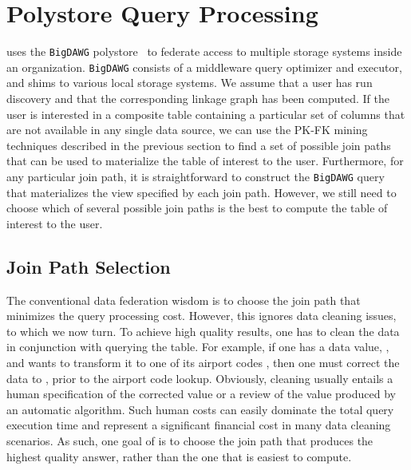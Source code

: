 \section{Polystore Query Processing}
\label{sec:curating}

\dcv uses the \texttt{BigDAWG}
polystore~\cite{DBLP:journals/pvldb/ElmoreDSBCGHHKK15} to federate access to
multiple storage systems inside an organization. \texttt{BigDAWG} consists of a
middleware query optimizer and executor, and shims to various local storage
systems. We assume that a user has run discovery and that the corresponding
linkage graph has been computed.  If the user is interested in a composite table
containing a particular set of columns that are not available in any single data
source,  we can use the PK-FK mining techniques described in the previous
section to find a set of possible join paths that can be used to materialize the
table of interest to the user. Furthermore, for any particular join path, it is
straightforward to construct the \texttt{BigDAWG} query that materializes the
view specified by each join path. However, we still need to choose which of
several possible join paths is the best to compute the table of interest to the
user.
	



\subsection{Join Path Selection}

The conventional data federation wisdom is to choose the join path that minimizes the query processing cost. However, this ignores data cleaning issues, to which we now turn. To achieve high quality results, one has to clean the data in conjunction with querying the table. For example, if one has a data value, , and wants to transform it to one of its airport codes , then one must correct the data to , prior to the airport code lookup. Obviously, cleaning usually entails a human specification of the corrected value or a review of the value produced by an automatic algorithm. Such human costs can easily dominate the total query execution time and represent a significant financial cost in many data cleaning scenarios.
As such, one goal of \dcv is to choose the join path that produces the highest quality answer, rather than the one that is easiest to compute. 

